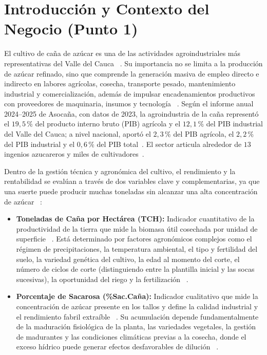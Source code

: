 \documentclass[conference]{IEEEtran}
\begin{document}
\section{Introducción y Contexto del Negocio (Punto 1)}

El cultivo de caña de azúcar es una de las actividades agroindustriales más representativas del Valle del Cauca ~\cite{asocana}. Su importancia no se limita a la producción de azúcar refinado, sino que comprende la generación masiva de empleo directo e indirecto en labores agrícolas, cosecha, transporte pesado, mantenimiento industrial y comercialización, además de impulsar encadenamientos productivos con proveedores de maquinaria, insumos y tecnología ~\cite{asocana}. Según el informe anual 2024--2025 de Asocaña, con datos de 2023, la agroindustria de la caña representó el $19{,}5\,\%$ del producto interno bruto (PIB) agrícola y el $12{,}1\,\%$ del PIB industrial del Valle del Cauca; a nivel nacional, aportó el $2{,}3\,\%$ del PIB agrícola, el $2{,}2\,\%$ del PIB industrial y el $0{,}6\,\%$ del PIB total~\cite{asocana}. El sector articula alrededor de $13$ ingenios azucareros y miles de cultivadores~\cite{asocana}.

Dentro de la gestión técnica y agronómica del cultivo, el rendimiento y la rentabilidad se evalúan a través de dos variables clave y complementarias, ya que una suerte puede producir muchas toneladas sin alcanzar una alta concentración de azúcar ~\cite{cenicana, actaagronomica}:
\begin{itemize}
    \item \textbf{Toneladas de Caña por Hectárea (TCH):} Indicador cuantitativo de la productividad de la tierra que mide la biomasa útil cosechada por unidad de superficie ~\cite{cenicana}. Está determinado por factores agronómicos complejos como el régimen de precipitaciones, la temperatura ambiental, el tipo y fertilidad del suelo, la variedad genética del cultivo, la edad al momento del corte, el número de ciclos de corte (distinguiendo entre la plantilla inicial y las socas sucesivas), la oportunidad del riego y la fertilización ~\cite{cenicana}.
    \item \textbf{Porcentaje de Sacarosa (\%Sac.Caña):} Indicador cualitativo que mide la concentración de azúcar presente en los tallos y define la calidad industrial y el rendimiento fabril extraíble ~\cite{actaagronomica}. Su acumulación depende fundamentalmente de la maduración fisiológica de la planta, las variedades vegetales, la gestión de madurantes y las condiciones climáticas previas a la cosecha, donde el exceso hídrico puede generar efectos desfavorables de dilución ~\cite{actaagronomica}.
\end{itemize}
\end{document}
